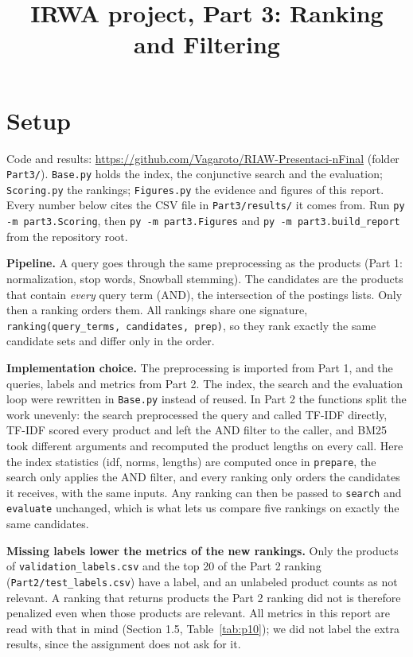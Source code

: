 \documentclass[10pt,a4paper]{article}
\title{IRWA project, Part 3: Ranking and Filtering}
\date{}
\newcommand{\file}[1]{\texttt{\small #1}}
\begin{document}
\maketitle
\vspace{-3em}

\section*{Setup}

Code and results: \url{https://github.com/Vagaroto/RIAW-Presentaci-nFinal} (folder \file{Part3/}).
\file{Base.py} holds the index, the conjunctive search and the evaluation; \file{Scoring.py} the rankings;
\file{Figures.py} the evidence and figures of this report. Every number below cites the CSV file in
\file{Part3/results/} it comes from. Run \file{py -m part3.Scoring}, then \file{py -m part3.Figures} and
\file{py -m part3.build\_report} from the repository root.

\textbf{Pipeline.} A query goes through the same preprocessing as the products (Part 1: normalization,
stop words, Snowball stemming). The candidates are the products that contain \emph{every} query term (AND),
the intersection of the postings lists. Only then a ranking orders them. All rankings share one signature,
\file{ranking(query\_terms, candidates, prep)}, so they rank exactly the same candidate sets and differ
only in the order. 

\textbf{Implementation choice.} The preprocessing is imported from Part 1, and the queries, labels and
metrics from Part 2. The index, the search and the evaluation loop were rewritten in \file{Base.py}
instead of reused. In Part 2 the functions split the work unevenly: the search preprocessed the query and
called TF-IDF directly, TF-IDF scored every product and left the AND filter to the caller, and BM25 took
different arguments and recomputed the product lengths on every call. Here the index statistics (idf,
norms, lengths) are computed once in \file{prepare}, the search only applies the AND filter, and every
ranking only orders the candidates it receives, with the same inputs. Any ranking can then be passed to
\file{search} and \file{evaluate} unchanged, which is what lets us compare five rankings on exactly the
same candidates.

\textbf{Missing labels lower the metrics of the new rankings.} Only the products of
\file{validation\_labels.csv} and the top 20 of the Part 2 ranking (\file{Part2/test\_labels.csv}) have a
label, and an unlabeled product counts as not relevant. A ranking that returns products the Part 2 ranking
did not is therefore penalized even when those products are relevant. All metrics in this report are
read with that in mind (Section 1.5, Table~\ref{tab:p10}); we did not label the extra results, since the
assignment does not ask for it.
\end{document}
